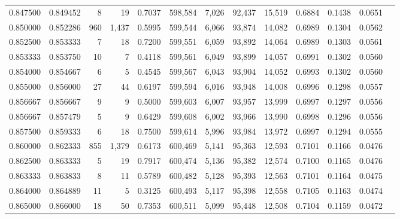 \begin{tabular}{rrrrrrrrrrrrr}
0.847500 & 0.849452 &      8 &    19 &                                     0.7037 & 598,584 &   7,026 &  92,437 &  15,519 & 0.6884 & 0.1438 & 0.0651 \\
0.850000 & 0.852286 &    960 & 1,437 &                                     0.5995 & 599,544 &   6,066 &  93,874 &  14,082 & 0.6989 & 0.1304 & 0.0562 \\
0.852500 & 0.853333 &      7 &    18 &                                     0.7200 & 599,551 &   6,059 &  93,892 &  14,064 & 0.6989 & 0.1303 & 0.0561 \\
0.853333 & 0.853750 &     10 &     7 &                                     0.4118 & 599,561 &   6,049 &  93,899 &  14,057 & 0.6991 & 0.1302 & 0.0560 \\
0.854000 & 0.854667 &      6 &     5 &                                     0.4545 & 599,567 &   6,043 &  93,904 &  14,052 & 0.6993 & 0.1302 & 0.0560 \\
0.855000 & 0.856000 &     27 &    44 &                                     0.6197 & 599,594 &   6,016 &  93,948 &  14,008 & 0.6996 & 0.1298 & 0.0557 \\
0.856667 & 0.856667 &      9 &     9 &                                     0.5000 & 599,603 &   6,007 &  93,957 &  13,999 & 0.6997 & 0.1297 & 0.0556 \\
0.856667 & 0.857479 &      5 &     9 &                                     0.6429 & 599,608 &   6,002 &  93,966 &  13,990 & 0.6998 & 0.1296 & 0.0556 \\
0.857500 & 0.859333 &      6 &    18 &                                     0.7500 & 599,614 &   5,996 &  93,984 &  13,972 & 0.6997 & 0.1294 & 0.0555 \\
0.860000 & 0.862333 &    855 & 1,379 &                                     0.6173 & 600,469 &   5,141 &  95,363 &  12,593 & 0.7101 & 0.1166 & 0.0476 \\
0.862500 & 0.863333 &      5 &    19 &                                     0.7917 & 600,474 &   5,136 &  95,382 &  12,574 & 0.7100 & 0.1165 & 0.0476 \\
0.863333 & 0.863833 &      8 &    11 &                                     0.5789 & 600,482 &   5,128 &  95,393 &  12,563 & 0.7101 & 0.1164 & 0.0475 \\
0.864000 & 0.864889 &     11 &     5 &                                     0.3125 & 600,493 &   5,117 &  95,398 &  12,558 & 0.7105 & 0.1163 & 0.0474 \\
0.865000 & 0.866000 &     18 &    50 &                                     0.7353 & 600,511 &   5,099 &  95,448 &  12,508 & 0.7104 & 0.1159 & 0.0472 \\

\end{tabular}
